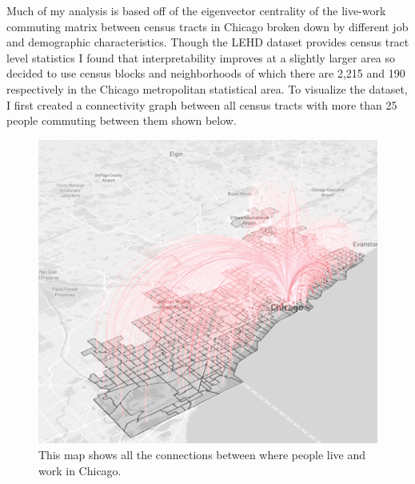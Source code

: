 \documentclass{article}
\theoremstyle{definition}
\theoremstyle{remark}
\begin{document}
Much of my analysis is based off of the eigenvector centrality of the live-work commuting matrix between census tracts in Chicago broken down by different job and demographic characteristics.  Though the LEHD dataset provides census tract level statistics I found that interpretability improves at a slightly larger area so decided to use census blocks and neighborhoods of which there are 2,215 and 190 respectively in the Chicago metropolitan statistical area.  To visualize the dataset, I first created a connectivity graph between all census tracts with more than 25 people commuting between them shown below.\\

\begin{figure}[H]
    \centering
    \includegraphics[width=1.0\textwidth]{arc-1}
    \caption{This map shows all the connections between where people live and work in Chicago.}
    \label{fig:arc-1}
\end{figure}
\end{document}
